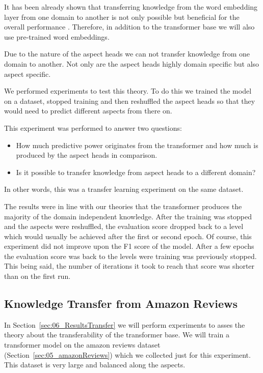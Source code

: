 It has been already shown that transferring knowledge from the word embedding layer from one domain to another is not only possible but beneficial for the overall performance \cite{Yosinski2014}. Therefore, in addition to the transformer base we will also use pre-trained word embeddings.
\medskip

Due to the nature of the aspect heads we can not transfer knowledge from one domain to another. Not only are the aspect heads highly domain specific but also aspect specific. 
\smallskip

We performed experiments to test this theory. To do this we trained the model on a dataset, stopped training and then reshuffled the aspect heads so that they would need to predict different aspects from there on. 

This experiment was performed to answer two questions: 

\begin{itemize}
	\item How much predictive power originates from the transformer and how much is produced by the aspect heads in comparison.
	\item Is it possible to transfer knowledge from aspect heads to a different domain?
\end{itemize}

In other words, this was a transfer learning experiment on the same dataset.

The results were in line with our theories that the transformer produces the majority of the domain independent knowledge. After the training was stopped and the aspects were reshuffled, the evaluation score dropped back to a level which would usually be achieved after the first or second epoch. Of course, this experiment did not improve upon the F1 score of the model. After a few epochs the evaluation score was back to the levels were training was previously stopped. This being said, the number of iterations it took to reach that score was shorter than on the first run.
\medskip

\subsection{Knowledge Transfer from Amazon Reviews}

In Section~\ref{sec:06_ResultsTransfer} we will perform experiments to asses the theory about the transferability of the transformer base. We will train a transformer model on the amazon reviews dataset {(Section~\ref{sec:05_amazonReviews})} which we collected just for this experiment. This dataset is very large and balanced along the aspects.
\medskip

